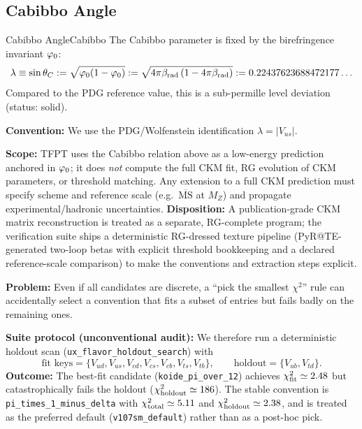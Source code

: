 \subsection{Cabibbo Angle}

\begin{corollary}{Cabibbo Angle}{Cabibbo}
The Cabibbo parameter is fixed by the birefringence invariant $\varphi_0$:
\begin{equation}
\lambda \equiv \sin\theta_C
:= \sqrt{\varphi_0(1-\varphi_0)}
:= \sqrt{4\pi\beta_{\text{rad}}\left(1-4\pi\beta_{\text{rad}}\right)}
:= 0.22437623688472177\ldots
\end{equation}
Compared to the PDG reference value, this is a sub-permille level deviation (status: solid).
\end{corollary}

\begin{tcolorbox}[colback=gray!5, colframe=gray!60, 
    title={\textbf{CKM Conventions and Scale (Clarification)}}, fonttitle=\bfseries\small]
\textbf{Convention:} We use the PDG/Wolfenstein identification $\lambda = |V_{us}|$.

\textbf{Scope:} TFPT uses the Cabibbo relation above as a low-energy prediction anchored in $\varphi_0$; it does \emph{not} compute the full CKM fit, RG evolution of CKM parameters, or threshold matching.
Any extension to a full CKM prediction must specify scheme and reference scale (e.g.\ $\overline{\mathrm{MS}}$ at $M_Z$) and propagate experimental/hadronic uncertainties.
\textbf{Disposition:} A publication-grade CKM matrix reconstruction is treated as a separate, RG-complete program; the verification suite ships a deterministic RG-dressed texture pipeline (PyR@TE-generated two-loop betas with explicit threshold bookkeeping and a declared reference-scale comparison) to make the conventions and extraction steps explicit.
\end{tcolorbox}

\begin{tcolorbox}[colback=gray!5, colframe=gray!60,
    title={\textbf{Convention Lock (Holdout Protocol; avoids ``convention shopping'')}}, fonttitle=\bfseries\small]
\textbf{Problem:} Even if all candidates are discrete, a ``pick the smallest $\chi^2$'' rule can accidentally select a convention that fits a subset of entries but fails badly on the remaining ones.

\textbf{Suite protocol (unconventional audit):} We therefore run a deterministic holdout scan (\texttt{ux\_flavor\_holdout\_search}) with
\[
\text{fit keys}=\{V_{ud},V_{us},V_{cd},V_{cs},V_{cb},V_{ts},V_{tb}\},\qquad
\text{holdout}=\{V_{ub},V_{td}\}.
\]
\textbf{Outcome:} The best-fit candidate (\texttt{koide\_pi\_over\_12}) achieves $\chi^2_{\rm fit}\simeq 2.48$ but catastrophically fails the holdout ($\chi^2_{\rm holdout}\simeq 186$). The stable convention is \texttt{pi\_times\_1\_minus\_delta} with $\chi^2_{\rm total}\simeq 5.11$ and $\chi^2_{\rm holdout}\simeq 2.38$, and is treated as the preferred default (\texttt{v107sm\_default}) rather than as a post-hoc pick.
\end{tcolorbox}

